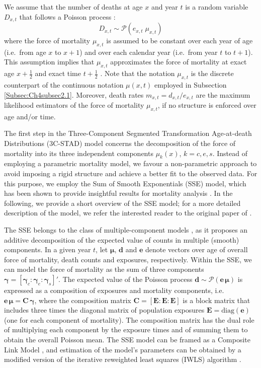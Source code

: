 \documentclass[Thesis]{subfiles}
\begin{document}
We assume that the number of deaths at age $x$ and year $t$ is a random variable $D_{x,t}$ that follows a Poisson process \citep{brillinger1986biometrics}:
\begin{equation}\label{Eq:Ch4Poisson}
D_{x,t} \sim \mathcal{P}(e_{x,t} \; \mu_{x,t}) 
\end{equation}
where the force of mortality $\mu_{x,t}$ is assumed to be constant over each year of age (i.e.~from age $x$ to $x+1$) and over each calendar year (i.e.~from year $t$ to $t+1$). This assumption implies that $\mu_{x,t}$ approximates the force of mortality at exact age $x+\frac{1}{2}$ and exact time $t+\frac{1}{2}$ \citep{cairns2009quantitative}. Note that the notation $\mu_{x,t}$ is the discrete counterpart of the continuous notation $\mu(x,t)$ employed in Subsection \ref{Subsec:Ch4subsec2.1}. Moreover, death rates $m_{x,t} = d_{x,t}/e_{x,t}$ are the maximum likelihood estimators of the force of mortality $\mu_{x,t}$, if no structure is enforced over age and/or time. 

The first step in the Three-Component Segmented Transformation Age-at-death Distributions (3C-STAD) model concerns the decomposition of the force of mortality into its three independent components $\mu_k(x)$, $k=c,e,s$. Instead of employing a parametric mortality model, we favour a non-parametric approach to avoid imposing a rigid structure and achieve a better fit to the observed data. For this purpose, we employ the Sum of Smooth Exponentials (SSE) model, which has been shown to provide insightful results for mortality analysis \citep{camarda2016sums,remund2018young}. In the following, we provide a short overview of the SSE model; for a more detailed description of the model, we refer the interested reader to the original paper of \cite{camarda2016sums}.

The SSE belongs to the class of multiple-component models \cite[also known as competing hazard models,][]{gage1993decline}, as it proposes an additive decomposition of the expected value of counts in multiple (smooth) components. In a given year $t$, let $\bm{\mu}$, $\bm{d}$ and $\bm{e}$ denote vectors over age of overall force of mortality, death counts and exposures, respectively. Within the SSE, we can model the force of mortality as the sum of three components $\bm{\gamma}=\left[\bm{\gamma}_c:\bm{\gamma}_e:\bm{\gamma}_s\right]'$. The expected value of the Poisson process $\bm{d} \sim \mathcal{P}(\bm{e}\,\bm{\mu})$ is expressed as a composition of exposures and mortality components, i.e.~$\bm{e}\,\bm{\mu} = \bm{C}\,\bm{\gamma}$, where the composition matrix $\bm{C}=\left[\bm{E}:\bm{E}:\bm{E}\right]$ is a block matrix that includes three times the diagonal matrix of population exposures $\bm{E}=\mathrm{diag}(\bm{e})$ (one for each component of mortality). The composition matrix has the dual role of multiplying each component by the exposure times and of summing them to obtain the overall Poisson mean. The SSE model can be framed as a Composite Link Model \citep{thompson1981composite}, and estimation of the model's parameters can be obtained by a modified version of the iterative reweighted least squares (IWLS) algorithm \citep{eilers2007ill}.  
\end{document}
